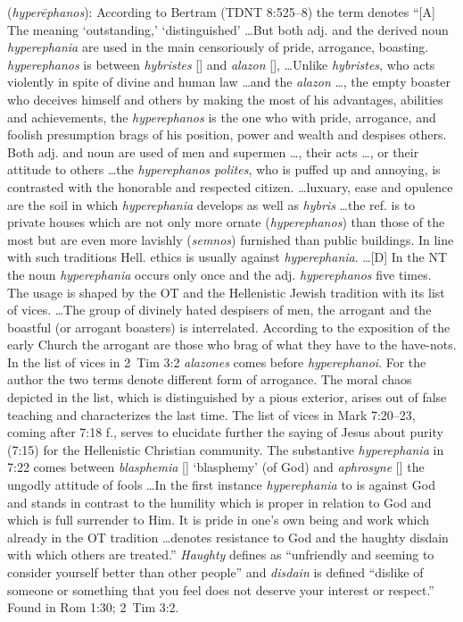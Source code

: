\item[Haughty disdainer,]

(\textit{hyperēphanos}):
According to Bertram (TDNT 8:525--8) the term denotes ``[A] The meaning `outstanding,' `distinguished' \ldots But both adj. and the derived noun \emph{hyperephania} are used in the main censoriously of pride, arrogance, boasting. \emph{hyperephanos} is between \emph{hybristes} [] and \emph{alazon} [], \ldots Unlike \emph{hybristes}, who acts violently in spite of divine and human law \ldots and the \emph{alazon} \ldots, the empty boaster who deceives himself and others by making the most of his advantages, abilities and achievements, the \emph{hyperephanos} is the one who with pride, arrogance, and foolish presumption brags of his position, power  and wealth and despises others. Both adj. and noun are used of men and supermen \ldots, their acts \ldots, or their attitude to others \ldots the \emph{hyperephanos polites}, who is puffed up and annoying, is contrasted with the honorable and respected citizen. \ldots luxuary, ease and opulence are the soil in which \emph{hyperephania} develops as well as \emph{hybris} \ldots the ref. is to private houses which are not only more ornate (\emph{hyperephanos}) than those of the most but are even more lavishly  (\emph{semnos}) furnished than public buildings. In line with such traditions Hell. ethics is usually against \emph{hyperephania}. \ldots [D] In the NT the noun \emph{hyperephania} occurs only once and the adj. \emph{hyperephanos} five times. The usage is shaped by the OT and the Hellenistic Jewish  tradition with its list of vices. \ldots The group of divinely hated despisers of men, the arrogant and the boastful (or arrogant boasters) is interrelated. According to the exposition of the early Church the arrogant are those who brag of what they have to the have-nots. In the list of vices in 2~Tim 3:2 \emph{alazones} comes before \emph{hyperephanoi}. For the author the two terms denote different form of arrogance. The moral chaos depicted in the list, which is distinguished by a pious exterior, arises out of false teaching and characterizes the last time. The list of vices in Mark 7:20--23, coming after 7:18 f., serves to elucidate further the saying of Jesus about purity (7:15) for the Hellenistic Christian community. The substantive \emph{hyperephania} in 7:22 comes between \emph{blasphemia} [] `blasphemy' (of God) and \emph{aphrosyne} [] the ungodly attitude of fools \ldots In the first instance \emph{hyperephania} to is against God and stands in contrast to the humility which is proper in relation to God and which is full surrender to Him. It is pride in one's own being and work which already in the OT tradition \ldots denotes resistance to God and the haughty disdain with which others are treated.'' \emph{Haughty} defines as ``unfriendly and seeming to consider yourself better than other people'' and \emph{disdain} is defined ``dislike of someone or something that you feel does not deserve your interest or respect.''
Found in Rom 1:30; 2~Tim 3:2.
